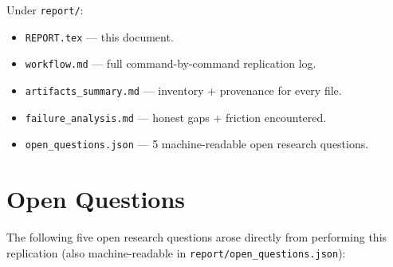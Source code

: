 \documentclass[11pt]{article}
\begin{document}
Under \verb|report/|:
\begin{itemize}
  \item \verb|REPORT.tex| — this document.
  \item \verb|workflow.md| — full command-by-command replication log.
  \item \verb|artifacts_summary.md| — inventory + provenance for every file.
  \item \verb|failure_analysis.md| — honest gaps + friction encountered.
  \item \verb|open_questions.json| — 5 machine-readable open research questions.
\end{itemize}

\section*{Open Questions}

The following five open research questions arose directly from performing
this replication (also machine-readable in \verb|report/open_questions.json|):
\end{document}

